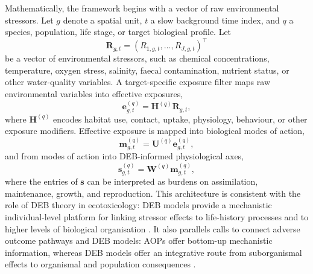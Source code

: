 Mathematically, the framework begins with a vector of raw environmental stressors. Let $g$ denote a spatial unit, $t$ a slow background time index, and $q$ a species, population, life stage, or target biological profile. Let
\begin{equation}
  \mathbf{R}_{g,t} = (R_{1,g,t},\ldots,R_{J,g,t})^\top
\end{equation}
be a vector of environmental stressors, such as chemical concentrations, temperature, oxygen stress, salinity, faecal contamination, nutrient status, or other water-quality variables. A target-specific exposure filter maps raw environmental variables into effective exposures,
\begin{equation}
  \mathbf{e}^{(q)}_{g,t} = \mathbf{H}^{(q)}\mathbf{R}_{g,t},
\end{equation}
where $\mathbf{H}^{(q)}$ encodes habitat use, contact, uptake, physiology, behaviour, or other exposure modifiers. Effective exposure is mapped into biological modes of action,
\begin{equation}
  \mathbf{m}^{(q)}_{g,t} = \mathbf{U}^{(q)}\mathbf{e}^{(q)}_{g,t},
\end{equation}
and from modes of action into DEB-informed physiological axes,
\begin{equation}
  \mathbf{s}^{(q)}_{g,t} = \mathbf{W}^{(q)}\mathbf{m}^{(q)}_{g,t},
\end{equation}
where the entries of $\mathbf{s}$ can be interpreted as burdens on assimilation, maintenance, growth, and reproduction. This architecture is consistent with the role of DEB theory in ecotoxicology: DEB models provide a mechanistic individual-level platform for linking stressor effects to life-history processes and to higher levels of biological organisation \citep{jager2014deb,romoli2024energy}. It also parallels calls to connect adverse outcome pathways and DEB models: AOPs offer bottom-up mechanistic information, whereas DEB models offer an integrative route from suborganismal effects to organismal and population consequences \citep{murphy2018aopdeb}.

